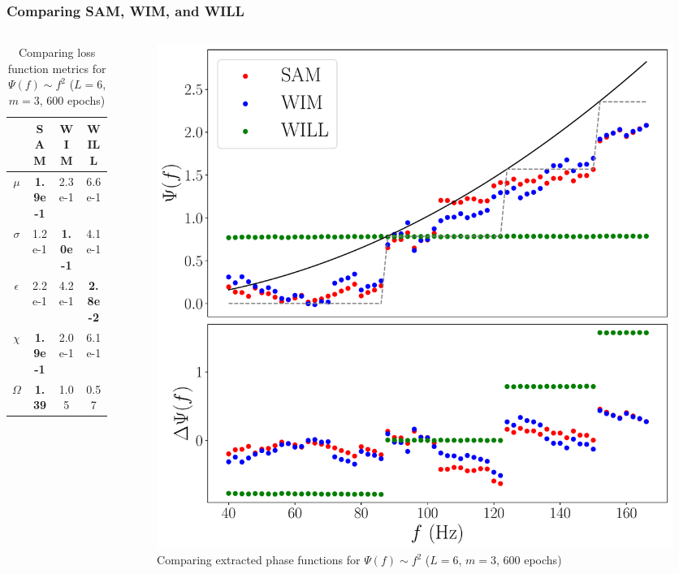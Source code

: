 \documentclass{beamer}
\begin{document}
\begin{frame}
\frametitle{Comparing SAM, WIM, and WILL}
\begin{columns}
\begin{column}{0.5\textwidth}
\begin{table}
\begin{tabular}{c || c| c| c }
& SAM & WIM & WILL \\ \hline \hline 
$\mu$ &  \textbf{1.9e-1} & 2.3e-1 & 6.6e-1  \\
$\sigma$ &  1.2e-1 & \textbf{1.0e-1} & 4.1e-1\\
$\epsilon$  &  2.2e-1 & 4.2e-1 & \textbf{2.8e-2}  \\
$\chi$ &  \textbf{1.9e-1} & 2.0e-1 & 6.1e-1  \\ \hline 
$\Omega$ &  \textbf{1.39} & 1.05 & 0.57
\end{tabular}
\caption{Comparing loss function metrics for $\Psi(f) \sim f^2$ ($L=6$, $m=3$, 600 epochs)}
\end{table}
\end{column}
\begin{column}{0.5\textwidth}
\begin{figure}
\centering 
\includegraphics[width=\textwidth]{im/SAM_WIM_WILL_F2_new}
\caption{Comparing extracted phase functions for $\Psi(f) \sim f^2$ ($L=6$, $m=3$, 600 epochs)}
\end{figure}
\end{column}
\end{columns}
\end{frame}
\end{document}
